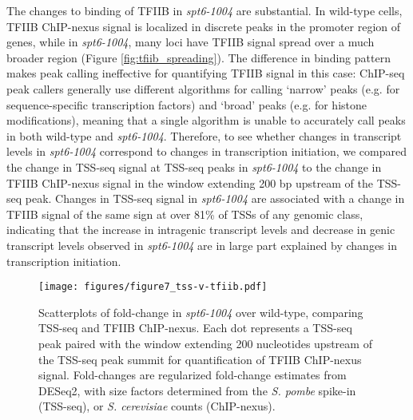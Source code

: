 \documentclass[9pt, letterpaper]{article}
\begin{document}
The changes to binding of TFIIB in \textit{spt6-1004} are substantial. In wild-type cells, TFIIB ChIP-nexus signal is localized in discrete peaks in the promoter region of genes, while in \textit{spt6-1004}, many loci have TFIIB signal spread over a much broader region (Figure \ref{fig:tfiib_spreading}). The difference in binding pattern makes peak calling ineffective for quantifying TFIIB signal in this case: ChIP-seq peak callers generally use different algorithms for calling `narrow' peaks (e.g. for sequence-specific transcription factors) and `broad' peaks (e.g. for histone modifications), meaning that a single algorithm is unable to accurately call peaks in both wild-type and \textit{spt6-1004}. Therefore, to see whether changes in transcript levels in \textit{spt6-1004} correspond to changes in transcription initiation, we compared the change in TSS-seq signal at TSS-seq peaks in \textit{spt6-1004} to the change in TFIIB ChIP-nexus signal in the window extending 200 bp upstream of the TSS-seq peak. Changes in TSS-seq signal in \textit{spt6-1004} are associated with a change in TFIIB signal of the same sign at over 81\% of TSSs of any genomic class, indicating that the increase in intragenic transcript levels and decrease in genic transcript levels observed in \textit{spt6-1004} are in large part explained by changes in transcription initiation.


\begin{figure}[h]
\centering
\texttt{[image: figures/figure7\_tss-v-tfiib.pdf]}
\caption{Scatterplots of fold-change in \textit{spt6-1004} over wild-type, comparing TSS-seq and TFIIB ChIP-nexus. Each dot represents a TSS-seq peak paired with the window extending 200 nucleotides upstream of the TSS-seq peak summit for quantification of TFIIB ChIP-nexus signal. Fold-changes are regularized fold-change estimates from DESeq2, with size factors determined from the \textit{S. pombe} spike-in (TSS-seq), or \textit{S. cerevisiae} counts (ChIP-nexus).}
\end{figure}
\end{document}
